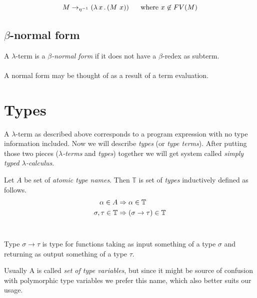 \documentclass[12pt,a4paper]{report}
\newcommand{\lterm}{$\lambda$-term\xspace}
\newcommand{\lterms}{$\lambda$-terms\xspace}
\begin{document}
$$M \rightarrow_{\eta^{-1}} ( \lambda \, x \, . \, (M~x) ) \text{ ~~~~where } x \not\in FV(M) $$




\subsection{$\beta$-normal form}

A \lterm is a \textit{$\beta$-normal form} if it does not have a $\beta$-redex as
subterm.
\\\\
A normal form may be thought of as a result of a term evaluation. 


\section{Types}
\label{deftype}

\newcommand{\ar}{\rightarrow\xspace}
\newcommand{\T}{\mathbb{T}\xspace}

A \lterm as described above
corresponds to a program expression with no type information
included. Now we will describe \textit{types} (or \textit{type terms}).
After putting those two pieces 
(\textit{\lterms} and \textit{types}) together 
we will get system called \textit{simply typed $\lambda$-calculus}.


\begin{definition}
Let $A$ be set of {\it atomic type names}. 
Then $\mathbb{T}$ is set of {\it types} inductively defined as follows.
\begin{align*}
\alpha      \in A  &\then   \alpha \in \T \\
\sigma,\tau \in \T &\then ( \sigma \ar  \tau ) \in \T 
\end{align*}~

\end{definition}

Type $\sigma \ar \tau$ is type for functions taking as input
something of a type $\sigma$ and returning 
as output something of a type $\tau$. 

Usually A is called \textit{set of type variables}, 
but since it might be source of confusion with polymorphic type variables
we prefer this name, which also better suits our usage. 
\end{document}

